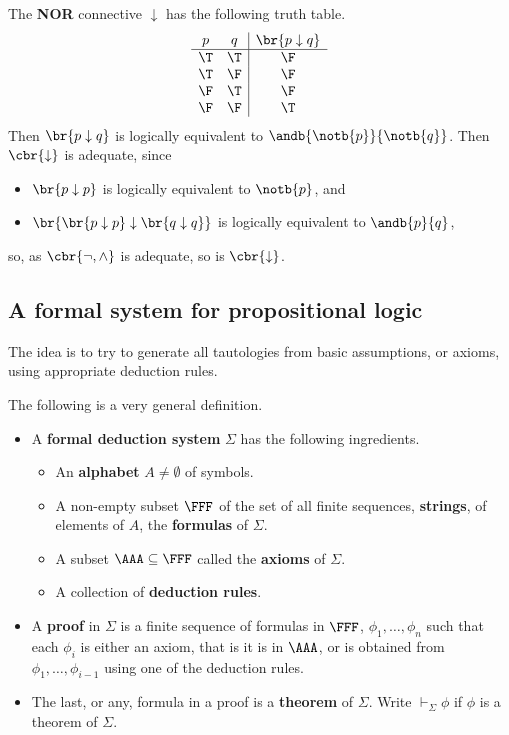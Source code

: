 \begin{example}
The \textbf{NOR} connective $ \downarrow $ has the following truth table.
$$
\begin{array}{cc|c}
p & q & \br{p \downarrow q} \\
\hline
\T & \T & \F \\
\T & \F & \F \\
\F & \T & \F \\
\F & \F & \T
\end{array}
$$
Then $ \br{p \downarrow q} $ is logically equivalent to $ \andb{\notb{p}}{\notb{q}} $. Then $ \cbr{\downarrow} $ is adequate, since
\begin{itemize}
\item $ \br{p \downarrow p} $ is logically equivalent to $ \notb{p} $, and
\item $ \br{\br{p \downarrow p} \downarrow \br{q \downarrow q}} $ is logically equivalent to $ \andb{p}{q} $,
\end{itemize}
so, as $ \cbr{\neg, \land} $ is adequate, so is $ \cbr{\downarrow} $.
\end{example}

\subsection{A formal system for propositional logic}

The idea is to try to generate all tautologies from basic assumptions, or axioms, using appropriate deduction rules.

\begin{definition}
The following is a very general definition.
\begin{itemize}
\item A \textbf{formal deduction system} $ \Sigma $ has the following ingredients.
\begin{itemize}
\item An \textbf{alphabet} $ A \ne \emptyset $ of symbols.
\item A non-empty subset $ \FFF $ of the set of all finite sequences, \textbf{strings}, of elements of $ A $, the \textbf{formulas} of $ \Sigma $.
\item A subset $ \AAA \subseteq \FFF $ called the \textbf{axioms} of $ \Sigma $.
\item A collection of \textbf{deduction rules}.
\end{itemize}
\item A \textbf{proof} in $ \Sigma $ is a finite sequence of formulas in $ \FFF $, $ \phi_1, \dots, \phi_n $ such that each $ \phi_i $ is either an axiom, that is it is in $ \AAA $, or is obtained from $ \phi_1, \dots, \phi_{i - 1} $ using one of the deduction rules.
\item The last, or any, formula in a proof is a \textbf{theorem} of $ \Sigma $. Write $ \vdash_\Sigma \phi $ if $ \phi $ is a theorem of $ \Sigma $.
\end{itemize}
\end{definition}


